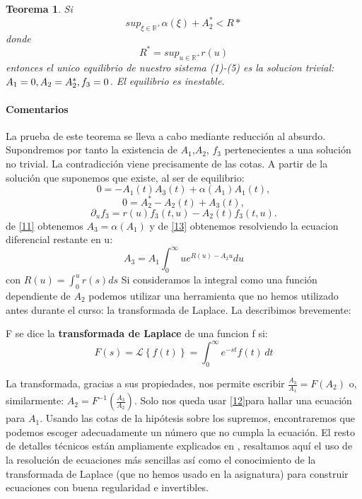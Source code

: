 \documentclass[1p]{elsarticle}
\newtheorem{thm}{Teorema}
\begin{document}
 

\begin{thm}
	Si $$sup_{\xi\in \mathbb{R}^+}\alpha(\xi)+A_2^*<R*$$
	donde $$R^*=sup_{u\in\mathbb{R}^+}r(u)$$
	entonces el unico equilibrio de nuestro sistema (1)-(5) es la solucion trivial:$A_1=0,\space A_2=A_2^*,\space f_3=0$. El equilibrio es inestable.
\end{thm}
\paragraph{Comentarios}La prueba de este teorema se lleva a cabo mediante reducción al absurdo. Supondremos por tanto la existencia de $A_1$,$A_2$, $f_3$ pertenecientes a una solución no trivial. La contradicción viene precisamente de las cotas. A partir de la solución que suponemos que existe, al ser de equilibrio:
\begin{equation}
0=-A_1(t)A_3(t)+\alpha(A_1)A_1(t),
\label{11}\end{equation}
\begin{equation}
0=A_2^*-A_2(t)+A_3(t),
\label{12}
\end{equation}
\begin{equation}
\partial_uf_3=r(u)f_3(t,u)-A_2(t)f_3(t,u).
\label{13}
\end{equation}
de \ref{11} obtenemos $A_3=\alpha(A_1)$ y de \ref{13} obtenemos resolviendo la ecuacion diferencial restante en u:
$$A_3=A_1\int_{0}^{\infty}ue^{R(u)-A_2u}du$$
con $R(u)=\int_{0}^{u}r(s)ds$
Si consideramos la integral como una función dependiente de $A_2$ podemos utilizar una herramienta que no hemos utilizado antes durante el curso: la transformada de Laplace.
La describimos brevemente:
\begin{rmk}
	F se dice la \textbf{transformada de Laplace}  de una funcion f si:$$F(s) = \mathcal{L} \left\{f(t)\right\} =\int_{0}^\infty e^{-st} f(t)\,dt$$
	\end{rmk}
La transformada, gracias a sus propiedades, nos permite escribir $\frac{A_3}{A_1}=F(A_2)$ o, similarmente:
$A_2=F^{-1}(\frac{A_3}{A_2})$. Solo nos queda usar \ref{12}para hallar una ecuación para $A_1$. Usando las cotas de la hipótesis sobre los supremos, encontraremos que podemos escoger adecuadamente un número que no cumpla la ecuación. El resto de detalles técnicos están ampliamente explicados en \cite{original}, resaltamos aquí el uso de la resolución de ecuaciones más sencillas así como el conocimiento de la transformada de Laplace (que no hemos usado en la asignatura) para construir ecuaciones con buena regularidad e invertibles.
\end{document}
